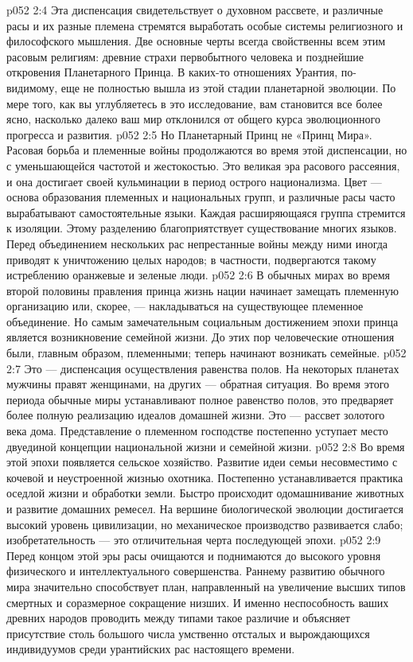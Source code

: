 \vs p052 2:4 Эта диспенсация свидетельствует о духовном рассвете, и различные расы и их разные племена стремятся выработать особые системы религиозного и философского мышления. Две основные черты всегда свойственны всем этим расовым религиям: древние страхи первобытного человека и позднейшие откровения Планетарного Принца. В каких\hyp{}то отношениях Урантия, по\hyp{}видимому, еще не полностью вышла из этой стадии планетарной эволюции. По мере того, как вы углубляетесь в это исследование, вам становится все более ясно, насколько далеко ваш мир отклонился от общего курса эволюционного прогресса и развития.
\vs p052 2:5 \pc Но Планетарный Принц не «Принц Мира». Расовая борьба и племенные войны продолжаются во время этой диспенсации, но с уменьшающейся частотой и жестокостью. Это великая эра расового рассеяния, и она достигает своей кульминации в период острого национализма. Цвет --- основа образования племенных и национальных групп, и различные расы часто вырабатывают самостоятельные языки. Каждая расширяющаяся группа стремится к изоляции. Этому разделению благоприятствует существование многих языков. Перед объединением нескольких рас непрестанные войны между ними иногда приводят к уничтожению целых народов; в частности, подвергаются такому истреблению оранжевые и зеленые люди.
\vs p052 2:6 В обычных мирах во время второй половины правления принца жизнь нации начинает замещать племенную организацию или, скорее, --- накладываться на существующее племенное объединение. Но самым замечательным социальным достижением эпохи принца является возникновение семейной жизни. До этих пор человеческие отношения были, главным образом, племенными; теперь начинают возникать семейные.
\vs p052 2:7 Это --- диспенсация осуществления равенства полов. На некоторых планетах мужчины правят женщинами, на других --- обратная ситуация. Во время этого периода обычные миры устанавливают полное равенство полов, это предваряет более полную реализацию идеалов домашней жизни. Это --- рассвет золотого века дома. Представление о племенном господстве постепенно уступает место двуединой концепции национальной жизни и семейной жизни.
\vs p052 2:8 Во время этой эпохи появляется сельское хозяйство. Развитие идеи семьи несовместимо с кочевой и неустроенной жизнью охотника. Постепенно устанавливается практика оседлой жизни и обработки земли. Быстро происходит одомашнивание животных и развитие домашних ремесел. На вершине биологической эволюции достигается высокий уровень цивилизации, но механическое производство развивается слабо; изобретательность --- это отличительная черта последующей эпохи.
\vs p052 2:9 \pc Перед концом этой эры расы очищаются и поднимаются до высокого уровня физического и интеллектуального совершенства. Раннему развитию обычного мира значительно способствует план, направленный на увеличение высших типов смертных и соразмерное сокращение низших. И именно неспособность ваших древних народов проводить между типами такое различие и объясняет присутствие столь большого числа умственно отсталых и вырождающихся индивидуумов среди урантийских рас настоящего времени.
